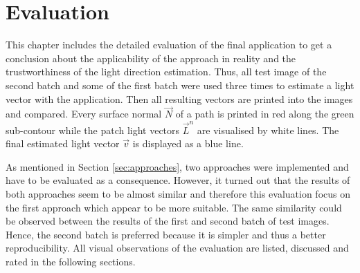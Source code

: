 \section{Evaluation} \label{sec:Evaluation}

This chapter includes the detailed evaluation of the final application to get a conclusion about the applicability of the approach in reality and the trustworthiness of the light direction estimation. Thus, all test image of the second batch and some of the first batch were used three times to estimate a light vector with the application. Then all resulting vectors are printed into the images and compared. Every surface normal $\vec{N}$ of a path is printed in red along the green sub-contour while the patch light vectors $\vec{L}^n$ are visualised by white lines. The final estimated light vector $\vec{v}$ is displayed as a blue line. 

As mentioned in Section \ref{sec:approaches}, two approaches were implemented and have to be evaluated as a consequence. However, it turned out that the results of both approaches seem to be almost similar and therefore this evaluation focus on the first approach which appear to be more suitable. The same similarity could be observed between the results of the first and second batch of test images. Hence, the second batch is preferred because it is simpler and thus a better reproducibility. All visual observations of the evaluation are listed, discussed and rated in the following sections.
